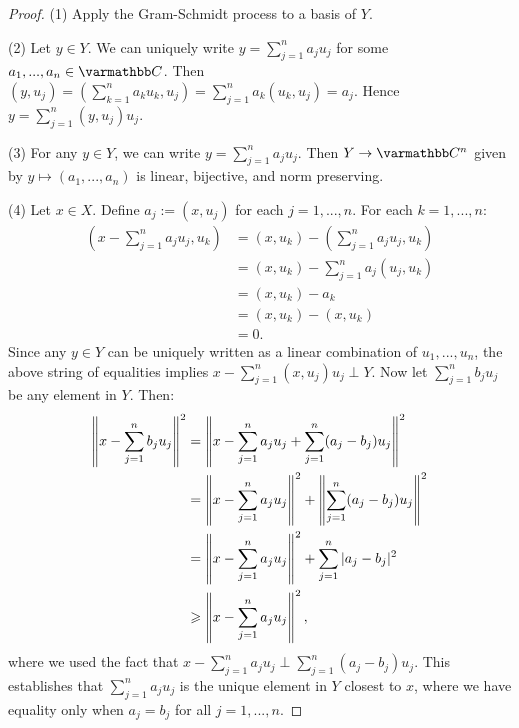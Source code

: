     \begin{proof}
        (1) Apply the Gram-Schmidt process to a basis of $Y$.

        (2) Let $y \in Y$. We can uniquely write $y = \sum_{j = 1}^n a_j u_j$ for some $a_1,...,a_n \in \bfC$. Then $(y,u_j) = \left( \sum_{k = 1}^n a_k u_k,u_j \right) = \sum_{j = 1}^n a_k(u_k,u_j) = a_j$. Hence $y = \sum_{j = 1}^n (y,u_j)u_j$.
        
        (3) For any $y \in Y$, we can write $y = \sum_{j = 1}^n a_j u_j$. Then $Y \rightarrow \bfC^n$ given by $y \mapsto (a_1,...,a_n)$ is linear, bijective, and norm preserving.

        (4) Let $x \in X$. Define $a_j := (x,u_j)$ for each $j=1,...,n$. For each $k = 1,...,n$:
            \begin{equation*}
            \begin{split}
                \left( x - \sum_{j = 1}^n a_j u_j , u_k\right)
                & = (x,u_k) - \left( \sum_{j = 1}^n a_j u_j, u_k \right) \\
                & = (x,u_k) - \sum_{j = 1}^n a_j(u_j,u_k) \\
                & = (x,u_k) - a_k \\
                & = (x,u_k) - (x,u_k) \\
                & = 0.
            \end{split}
            \end{equation*}
        Since any $y \in Y$ can be uniquely written as a linear combination of $u_1,...,u_n$, the above string of equalities implies $x- \sum_{j = 1}^n (x,u_j)u_j \perp Y$. Now let $\sum_{j = 1}^n b_j u_j$ be any element in $Y$. Then:
            \begin{equation*}
            \begin{split}
                \left\lVert x - \sum_{j = 1}^n b_j u_j \right\rVert^2
                & = \left\lVert x - \sum_{j = 1}^n a_j u_j + \sum_{j = 1}^n (a_j - b_j)u_j \right\rVert^2 \\
                & = \left\lVert x - \sum_{j = 1}^n a_j u_j \right\rVert^2 + \left\lVert \sum_{j = 1}^n (a_j - b_j)u_j \right\rVert^2 \\
                & = \left\lVert x - \sum_{j = 1}^n a_j u_j \right\rVert^2 + \sum_{j = 1}^n |a_j - b_j|^2 \\
                & \geqslant \left\lVert x - \sum_{j = 1}^n a_j u_j \right\rVert^2,
            \end{split}
            \end{equation*}
        where we used the fact that $x- \sum_{j = 1}^n a_j u_j \perp \sum_{j = 1}^n (a_j-b_j)u_j$. This establishes that $\sum_{j = 1}^n a_j u_j$ is the unique element in $Y$ closest to $x$, where we have equality only when $a_j = b_j$ for all $j = 1,...,n$.
    \end{proof}

